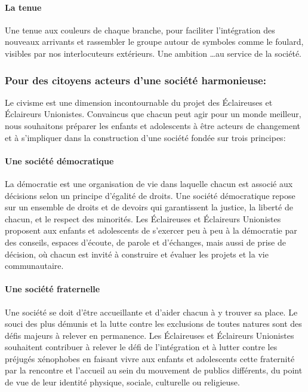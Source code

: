 \documentclass[titlepage,11pt,a4paper]{article}
\begin{document}
\paragraph*{La tenue}

Une tenue aux couleurs de chaque branche, pour faciliter l'intégration des nouveaux arrivants et rassembler le groupe autour de symboles comme le foulard, visibles par nos interlocuteurs extérieurs.
Une ambition …au service de la société.

\subsubsection*{Pour des citoyens acteurs d'une société harmonieuse:}
Le civisme est une dimension incontournable du projet des Éclaireuses et Éclaireurs Unionistes. Convaincus que chacun peut agir pour un monde meilleur, nous souhaitons préparer les enfants et adolescents à être acteurs de changement et à s'impliquer dans la construction d'une société fondée sur trois principes:

\paragraph*{Une société démocratique}
La démocratie est une organisation de vie dans laquelle chacun est associé aux décisions selon un principe d'égalité de droits. Une société démocratique repose sur un ensemble de droits et de devoirs qui garantissent la justice, la liberté de chacun, et le respect des minorités. Les Éclaireuses et Éclaireurs Unionistes proposent aux enfants et adolescents de s'exercer peu à peu à la démocratie par des conseils, espaces d'écoute, de parole et d'échanges, mais aussi de prise de décision, où chacun est invité à construire et évaluer les projets et la vie communautaire.

\paragraph*{Une société fraternelle}
Une société se doit d'être accueillante et d'aider chacun à y trouver sa place. Le souci des plus démunis et la lutte contre les exclusions de toutes natures sont des défis majeurs à relever en permanence. Les Éclaireuses et Éclaireurs Unionistes souhaitent contribuer à relever le défi de l'intégration et à lutter contre les préjugés xénophobes en faisant vivre aux enfants et adolescents cette fraternité par la rencontre et l'accueil au sein du mouvement de publics différents, du point de vue de leur identité physique, sociale, culturelle ou religieuse.
\end{document}
